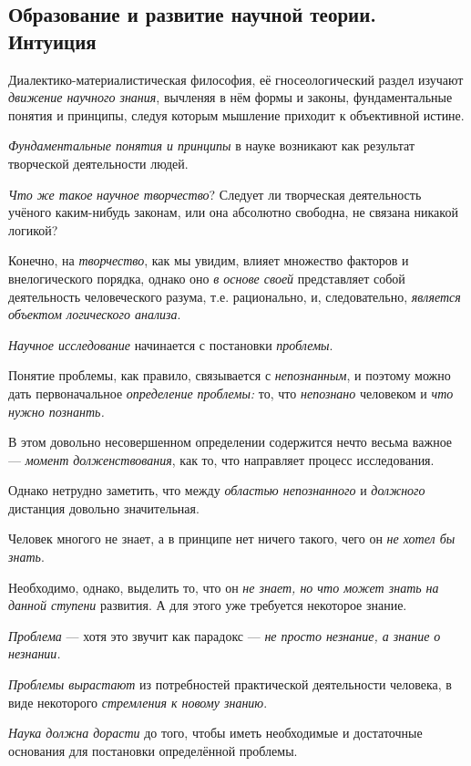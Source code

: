 \documentclass[a4paper,14pt,russian]{extreport}
\begin{document}
\subsection{Образование и развитие научной теории. Интуиция}

Диалектико-материалистическая философия, её гносеологический раздел изучают \emph{движение научного знания}, вычленяя в нём формы и законы, фундаментальные понятия и принципы, следуя которым мышление приходит к объективной истине.

\emph{Фундаментальные понятия и принципы} в науке возникают как результат творческой деятельности людей.

\emph{Что же такое} \emph{научное творчество}? Следует ли творческая деятельность учёного каким-нибудь законам, или она абсолютно свободна, не связана никакой логикой?

Конечно, на \emph{творчество}, как мы увидим, влияет множество факторов и внелогического порядка, однако оно \emph{в основе своей} представляет собой деятельность человеческого разума, т.е. рационально, и, следовательно, \emph{является объектом логического анализа}.

\emph{Научное исследование} начинается с постановки \emph{проблемы}.

Понятие проблемы, как правило, связывается с \emph{непознанным}, и поэтому можно дать первоначальное \emph{определение проблемы:} то, что \emph{непознано} человеком и \emph{что нужно познанть.}

В этом довольно несовершенном определении содержится нечто весьма важное --- \emph{момент долженствования}, как то, что направляет процесс исследования.

Однако нетрудно заметить, что между \emph{областью непознанного} и \emph{должного} дистанция довольно значительная.

Человек многого не знает, а в принципе нет ничего такого, чего он \emph{не хотел бы знать}.

Необходимо, однако, выделить то, что он \emph{не знает, но что может знать на данной ступени} развития. А для этого уже требуется некоторое знание.

\emph{Проблема} --- хотя это звучит как парадокс --- \emph{не просто незнание, а знание о незнании.}

\emph{Проблемы вырастают} из потребностей практической деятельности человека, в виде некоторого \emph{стремления к новому знанию}.

\emph{Наука должна дорасти} до того, чтобы иметь необходимые и достаточные основания для постановки определённой проблемы.
\end{document}
